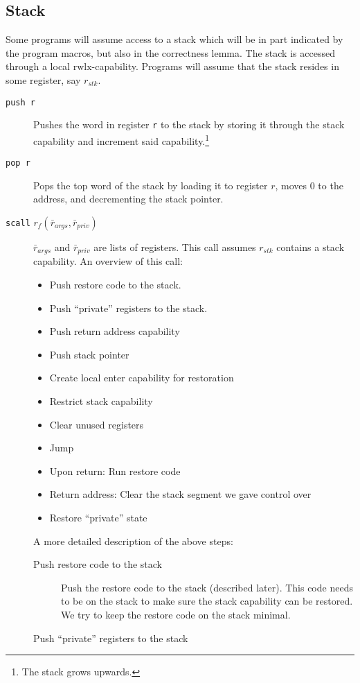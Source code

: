 \documentclass[a4paper]{article}
\newcommand{\var}[1]{\mathit{#1}}
\newcommand{\plainperm}[1]{\mathrm{#1}}
\newcommand{\rwlx}{\plainperm{rwlx}}
\begin{document}
\subsection{Stack}
Some programs will assume access to a stack which will be in part indicated by the program macros, but also in the correctness lemma. The stack is accessed through a local $\rwlx$-capability. Programs will assume that the stack resides in some register, say $r_{\var{stk}}$.
\begin{description}
\item[\texttt{push r}] Pushes the word in register \texttt{r} to the stack by storing it through the stack capability and increment said capability.\footnote{The stack grows upwards.}
\item[\texttt{pop r}] Pops the top word of the stack by loading it to register $r$, moves 0 to the address, and decrementing the stack pointer.
\item[\texttt{scall} $r_f(\bar{r}_{\var{args}},\bar{r}_{\var{priv}})$] $\bar{r}_{\var{args}}$ and $\bar{r}_{\var{priv}}$ are lists of registers. This call assumes $r_{\var{stk}}$ contains a stack capability. An overview of this call:
  \begin{itemize}
  \item Push restore code to the stack.
  \item Push ``private'' registers to the stack.
  \item Push return address capability 
  \item Push stack pointer
  \item Create local enter capability for restoration
  \item Restrict stack capability
  \item Clear unused registers
  \item Jump
  \item Upon return: Run restore code
  \item Return address: Clear the stack segment we gave control over
  \item Restore ``private'' state
  \end{itemize}
A more detailed description of the above steps:
\begin{description}
  \item [Push restore code to the stack]
    Push the restore code to the stack (described later). This code needs to be on the stack to make sure the stack capability can be restored. We try to keep the restore code on the stack minimal.
  \item [Push ``private'' registers to the stack]

\end{description}
\end{description}
\end{document}
